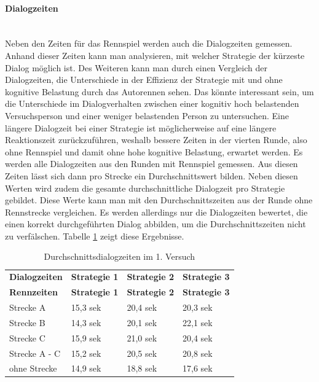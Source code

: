 \documentclass[12pt,a4paper]{scrartcl}
\begin{document}
\paragraph{Dialogzeiten}
~\\
Neben den Zeiten für das Rennspiel werden auch die Dialogzeiten gemessen. Anhand dieser Zeiten kann man analysieren, mit welcher Strategie der kürzeste Dialog möglich ist. Des Weiteren kann man durch einen Vergleich der Dialogzeiten, die Unterschiede in der Effizienz der Strategie mit und ohne kognitive Belastung durch das Autorennen sehen. Das könnte interessant sein, um die Unterschiede im Dialogverhalten zwischen einer kognitiv hoch belastenden Versuchsperson und einer weniger belastenden Person zu untersuchen. Eine längere Dialogzeit bei einer Strategie ist möglicherweise auf eine längere Reaktionszeit zurückzuführen, weshalb bessere Zeiten in der vierten Runde, also ohne Rennspiel und damit ohne hohe kognitive Belastung, erwartet werden. Es werden alle Dialogzeiten aus den Runden mit Rennspiel gemessen. Aus diesen Zeiten lässt sich dann pro Strecke ein Durchschnittswert bilden. Neben diesen Werten wird zudem die gesamte durchschnittliche Dialogzeit pro Strategie gebildet. Diese Werte kann man mit den Durchschnittszeiten aus der Runde ohne Rennstrecke vergleichen. Es werden allerdings nur die Dialogzeiten bewertet, die einen korrekt durchgeführten Dialog abbilden, um die Durchschnittszeiten nicht zu verfälschen.  Tabelle \ref{Durchschnittsdialogzeiten1} zeigt diese Ergebnisse.

\begin{longtable}{p{3cm}p{3cm}p{3cm}p{3cm} }
	\label{Durchschnittsdialogzeiten1}\\
	\caption[Durchschnittsdialogzeiten im 1. Versuch]{Durchschnittsdialogzeiten im 1. Versuch}\\
	\hline
	\textbf{Dialogzeiten}&\textbf{Strategie 1}&\textbf{Strategie 2} &\textbf{Strategie 3}\\
	\hline
	\endfirsthead
	\hline
	\textbf{Rennzeiten}&\textbf{Strategie 1}&\textbf{Strategie 2} &\textbf{Strategie 3}\\
	\hline
	\endhead
Strecke A & 15,3 sek & 20,4 sek & 20,3 sek \\
Strecke B & 14,3 sek & 20,1 sek & 22,1 sek \\
Strecke C  & 15,9 sek & 21,0 sek & 20,4 sek \\
Strecke A - C & 15,2 sek & 20,5 sek & 20,8 sek \\
ohne Strecke &  14,9 sek & 18,8 sek & 17,6 sek \\
\hline
\end{longtable}
\end{document}
